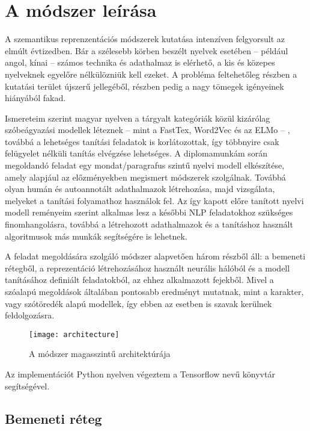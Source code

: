 \chapter{A módszer leírása}
\label{ch:method}

A szemantikus reprenzentációs módszerek kutatása intenzíven felgyorsult az elmúlt évtizedben. Bár a szélesebb körben beszélt nyelvek esetében – például angol, kínai – számos technika és adathalmaz is elérhető, a kis és közepes nyelveknek egyelőre nélkülözniük kell ezeket. A probléma feltehetőleg részben a kutatási terület újszerű jellegéből, részben pedig a nagy tömegek igényeinek hiányából fakad. 

Ismereteim szerint magyar nyelven a tárgyalt kategóriák közül kizárólag szóbeágyazási modellek léteznek – mint a FastTex, Word2Vec és az ELMo – , továbbá a lehetséges tanítási feladatok is korlátozottak, így többnyire csak felügyelet nélküli tanítás elvégzése lehetséges. A diplomamunkám során megoldandó feladat egy mondat/paragrafus szintű nyelvi modell elkészítése, amely alapjául az előzményekben megismert módszerek szolgálnak. Továbbá olyan humán és autoannotált adathalmazok létrehozása, majd vizsgálata, melyeket a tanítási folyamathoz használok fel. Az így kapott előre tanított nyelvi modell reményeim szerint alkalmas lesz a későbbi NLP feladatokhoz szükséges finomhangolásra, továbbá a létrehozott adathalmazok és a tanításhoz használt algoritmusok más munkák segítségére is lehetnek.

A feladat megoldására szolgáló módszer alapvetően három részből áll: a bemeneti rétegből, a reprezentáció létrehozásához használt neurális hálóból és a modell tanításához definiált feladatokból, az ehhez alkalmazott fejekből. Mivel a szóalapú megoldások általában pontosabb eredményt mutatnak, mint a karakter, vagy szótöredék alapú modellek, így ebben az esetben is szavak kerülnek feldolgozásra.

\begin{figure}[H]
	\centering
	\texttt{[image: architecture]}
	\caption{A módszer magasszintű architektúrája}
\end{figure}

Az implementációt Python nyelven végeztem a Tensorflow \cite{tensorflow} nevű könyvtár segítségével.

\section{Bemeneti réteg}

